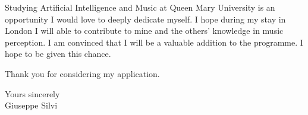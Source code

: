 \documentclass[
	12pt,
	a4paper,
	]{article}
\begin{document}
Studying Artificial Intelligence and Music at Queen Mary University is an opportunity I would love to deeply dedicate myself. I hope during my stay in London I will able to contribute to mine and the others' knowledge in music perception. I am convinced that I will be a valuable addition to the programme. 
I hope to be given this chance.

Thank you for considering my application.\\
\bigskip

Yours sincerely \\
\indent Giuseppe Silvi
\end{document}
